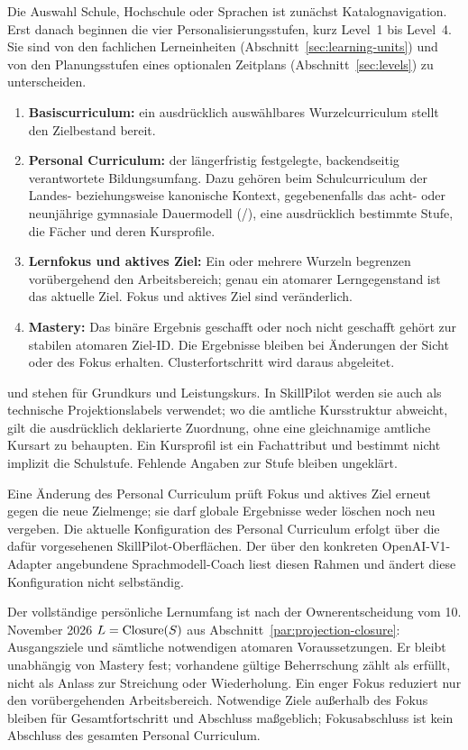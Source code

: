Die Auswahl \glqq Schule\grqq{}, \glqq Hochschule\grqq{} oder \glqq Sprachen\grqq{} ist zunächst
Katalognavigation. Erst danach beginnen die vier
Personalisierungsstufen, kurz Level~1 bis Level~4. Sie sind von den
fachlichen Lerneinheiten (Abschnitt~\ref{sec:learning-units}) und von den
Planungsstufen eines optionalen Zeitplans (Abschnitt~\ref{sec:levels}) zu
unterscheiden.

\begin{enumerate}
\item \textbf{Basiscurriculum:} ein ausdrücklich auswählbares
Wurzelcurriculum stellt den Zielbestand bereit.
\item \textbf{Personal Curriculum:} der längerfristig festgelegte,
backendseitig verantwortete Bildungsumfang. Dazu gehören beim
Schulcurriculum der Landes- beziehungsweise kanonische Kontext,
gegebenenfalls das acht- oder neunjährige gymnasiale Dauermodell
(/), eine ausdrücklich bestimmte Stufe, die Fächer
und deren Kursprofile.
\item \textbf{Lernfokus und aktives Ziel:} Ein oder mehrere Wurzeln
begrenzen vorübergehend den Arbeitsbereich; genau ein atomarer
Lerngegenstand ist das aktuelle Ziel. Fokus und aktives Ziel sind
veränderlich.
\item \textbf{Mastery:} Das binäre Ergebnis \glqq geschafft\grqq{} oder
\glqq noch nicht geschafft\grqq{} gehört zur stabilen atomaren Ziel-ID.
Die Ergebnisse bleiben bei Änderungen der Sicht oder des
Fokus erhalten. Clusterfortschritt wird daraus abgeleitet.
\end{enumerate}

 und  stehen für Grundkurs und Leistungskurs. In
SkillPilot werden sie auch als technische Projektionslabels verwendet;
wo die amtliche Kursstruktur abweicht, gilt die ausdrücklich deklarierte
Zuordnung, ohne eine gleichnamige amtliche Kursart zu behaupten.
Ein Kursprofil ist ein Fachattribut und bestimmt nicht implizit
die Schulstufe. Fehlende Angaben zur Stufe bleiben ungeklärt.

Eine Änderung des Personal Curriculum prüft Fokus und aktives Ziel erneut
gegen die neue Zielmenge; sie darf globale Ergebnisse weder löschen
noch neu vergeben. Die aktuelle Konfiguration des Personal Curriculum
erfolgt über die dafür vorgesehenen SkillPilot-Oberflächen. Der
über den konkreten OpenAI-V1-Adapter angebundene Sprachmodell-Coach liest
diesen Rahmen und ändert diese Konfiguration nicht selbständig.

Der vollständige persönliche Lernumfang ist nach der Ownerentscheidung
vom 10. November 2026 $L=\operatorname{Closure}(S)$ aus
Abschnitt~\ref{par:projection-closure}: Ausgangsziele und sämtliche
notwendigen atomaren Voraussetzungen. Er bleibt unabhängig von Mastery
fest; vorhandene gültige Beherrschung zählt als erfüllt, nicht als Anlass
zur Streichung oder Wiederholung. Ein enger Fokus reduziert nur den
vorübergehenden Arbeitsbereich. Notwendige Ziele außerhalb des Fokus
bleiben für Gesamtfortschritt und Abschluss maßgeblich; Fokusabschluss
ist kein Abschluss des gesamten Personal Curriculum.

